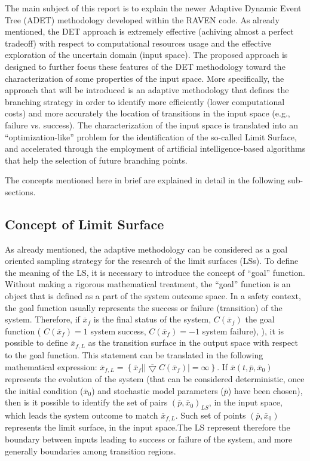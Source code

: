 \label{sec:DETRavenApproach}
The main subject of this report is to explain the newer Adaptive Dynamic Event Tree (ADET) methodology developed within the RAVEN code. As already mentioned, the DET approach is extremely effective (achiving almost a perfect tradeoff) with respect to computational resources usage and the effective exploration of the uncertain domain (input space). The proposed approach is designed to further focus these features of the DET methodology toward the characterization of some properties of the input space. More specifically, the approach that will be introduced is an adaptive methodology that defines the branching strategy in order to identify more efficiently (lower computational costs) and more accurately the location of transitions in the input space (e.g., failure vs. success). The characterization of the input space is translated into an “optimization-like” problem for the identification of the so-called Limit Surface, and accelerated through the employment of artificial intelligence-based algorithms that help the selection of future branching points.

The concepts mentioned here in brief are explained in detail in the following sub-sections.
\subsection{Concept of Limit Surface }
\label{sec:LimitS}
 As already mentioned, the adaptive methodology can be considered as a goal oriented sampling strategy for the research of the limit surfaces (LSs). To define the meaning of the LS, it is necessary to introduce the concept of “goal” function. Without making a rigorous mathematical treatment, the “goal” function is an object that is defined as a part of the system outcome space. In a safety context, the goal function usually represents the success or failure (transition) of the system. Therefore, if $\overline{x}_{f}$ is the final status of the system, $C\left (\overline{x}_{f}\right )$ the goal function ( $C\left (\overline{x}_{f}\right ) = 1$ system success,  $C\left (\overline{x}_{f}\right ) = -1$ system failure), ), it is possible to define $\overline{x}_{f,L}$ as the transition surface in the output space with respect to the goal function. This statement can be translated in the following mathematical expression: $\overline{x}_{f,L} = \left \{ \overline{x}_{f}|\left | \overline{\bigtriangledown} C\left ( \overline{x}_{f} \right ) \right |= \infty \right \}$. If $\overline{x}\left (t,\overline{p},\overline{x}_{0}  \right )$ represents the evolution of the system (that can be considered deterministic, once the initial condition ($\overline{x}_{0} $) and stochastic model parameters ($\overline{p}$) have been chosen), then is it possible to identify the set of pairs $\left ( \overline{p},\overline{x}_{0} \right )_{LS}$, in the input space, which leads the system outcome to match $\overline{x}_{f,L}$. Such set of points $\left ( \overline{p},\overline{x}_{0} \right )$ represents the limit surface, in the input space.The LS represent therefore the boundary between inputs leading to success or failure of the system, and more generally boundaries among transition regions.

